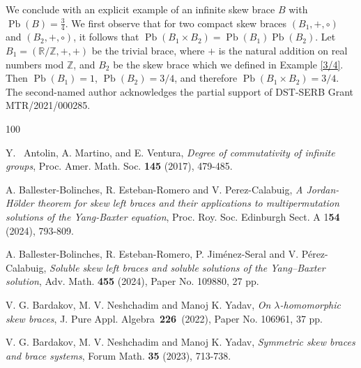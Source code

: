 \documentclass[oneside]{amsart}
\numberwithin{equation}{section}
\theoremstyle{plain}
\theoremstyle{definition}
\newcommand{\Pb}{\operatorname{Pb} }
\begin{document}
    
  We conclude with an explicit example of an infinite skew brace $B$ with $\Pb(B)=\frac{3}{4}$. We first observe that 
 for two  compact skew braces $(B_1,+, \circ)$ and $(B_2,+, \circ)$, it follows that $\Pb(B_1 \times B_2) = \Pb(B_1)\Pb(B_2)$. 
Let $B_1=(\mathbb{R}/\mathbb{Z},+,+)$ be the trivial brace, where $+$ is the natural addition on real numbers  mod $\mathbb{Z}$, and $B_2$ be the skew brace which we defined in Example \ref{3/4}. Then $\Pb(B_1)=1$, $\Pb(B_2)=3/4$, and therefore  $\Pb(B_1\times B_2)=3/4$.\\


 The second-named author acknowledges the partial support of DST-SERB Grant MTR/2021/000285.
    
\begin{thebibliography}{100} 

Y.~ Antolin, A.  Martino, and  E. Ventura,  \emph{Degree of commutativity of infinite groups},  Proc. Amer.  Math. Soc. {\bf  145} (2017), 479-485.



A. Ballester-Bolinches, R. Esteban-Romero and V. Perez-Calabuig, \emph{A Jordan-Hölder theorem for skew left braces and their applications to multipermutation solutions of the Yang-Baxter equation}, Proc. Roy. Soc. Edinburgh Sect. A 1{\bf 54} (2024), 793-809.

A. Ballester-Bolinches, R. Esteban-Romero, P. Jiménez-Seral and V. Pérez-Calabuig,  \emph{Soluble skew left braces and soluble solutions of the Yang–Baxter solution},  Adv. Math. {\bf 455} (2024), Paper No. 109880, 27 pp.


V. G.  Bardakov, M.  V. Neshchadim and Manoj K. Yadav,  \emph{On  $\lambda$-homomorphic skew braces}, J. Pure 	Appl. Algebra {\bf 226} (2022), Paper No. 106961, 37 pp.

V. G.  Bardakov, M.  V. Neshchadim and Manoj K. Yadav,
\emph{Symmetric skew braces and brace systems},
Forum Math. {\bf 35} (2023), 713-738.


\end{thebibliography}
\end{document}
